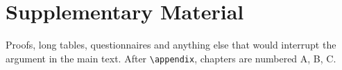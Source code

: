 \chapter{Supplementary Material}\label{app:supplement}
Proofs, long tables, questionnaires and anything else that would interrupt the argument
in the main text. After \texttt{\textbackslash appendix}, chapters are numbered A, B, C.
